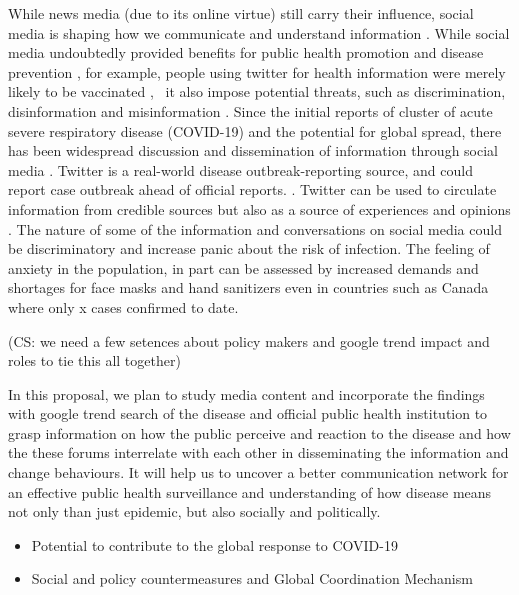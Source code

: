 While news media (due to its online virtue) still carry their influence, social media is shaping how we communicate and understand information \citep{LiuSieg19}.  While social media undoubtedly provided benefits for public health promotion and disease prevention \cite{BascHill20, SunYang20}, for example, people using twitter for health information were merely likely to be vaccinated \citep{AhmeQuin18},  it also impose potential threats, such as discrimination, disinformation and misinformation \citep{ChouOa18, McKevanS19}.  Since the initial reports of cluster of acute severe respiratory disease (COVID-19) and the potential for global spread, there has been widespread discussion and dissemination of information through social media \citep{?}.  Twitter is a real-world disease outbreak-reporting source, and could report case outbreak ahead of official reports. \citep{YoutDara19}.  Twitter can be used to circulate information from credible sources but also as a source of experiences and opinions \citep{ChewEyes10}.  The nature of some of the information and conversations on social media could be discriminatory and increase panic about the risk of infection. The feeling of anxiety in the population, in part can be assessed by increased demands and shortages for face masks and hand sanitizers even in countries such as Canada where only x cases confirmed to date. 

(CS:  we need a few setences about policy makers and google trend impact and roles to tie this all together)

In this proposal, we plan to study media content and incorporate the findings with google trend search of the disease and official public health institution to grasp information on how the public perceive and reaction to the disease and how the these forums interrelate with each other in disseminating the information and change behaviours.  It will help us to uncover a better communication network for an effective public health surveillance and understanding of how disease means not only than just epidemic, but also socially and politically.


\begin{itemize}
\item{Potential to contribute to the global response to COVID-19}
\item{Social and policy countermeasures and Global Coordination Mechanism}
\end{itemize}

